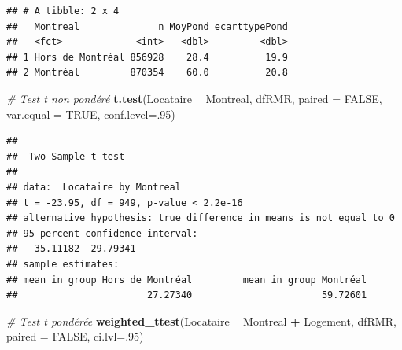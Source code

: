 \documentclass[
  11pt,
  french,
]{book}
\makeatletter
\newenvironment{Shaded}{\begin{snugshade}}{\end{snugshade}}
\newcommand{\CommentTok}[1]{\textcolor[rgb]{0.56,0.35,0.01}{\textit{#1}}}
\newcommand{\DataTypeTok}[1]{\textcolor[rgb]{0.13,0.29,0.53}{#1}}
\newcommand{\DecValTok}[1]{\textcolor[rgb]{0.00,0.00,0.81}{#1}}
\newcommand{\KeywordTok}[1]{\textcolor[rgb]{0.13,0.29,0.53}{\textbf{#1}}}
\newcommand{\NormalTok}[1]{#1}
\newcommand{\OperatorTok}[1]{\textcolor[rgb]{0.81,0.36,0.00}{\textbf{#1}}}
\newcommand{\OtherTok}[1]{\textcolor[rgb]{0.56,0.35,0.01}{#1}}
\newcommand{\StringTok}[1]{\textcolor[rgb]{0.31,0.60,0.02}{#1}}
\newenvironment{kframe}{%
\medskip{}
\setlength{\fboxsep}{.8em}
 \def\at@end@of@kframe{}%
 \ifinner\ifhmode%
  \def\at@end@of@kframe{\end{minipage}}%
  \begin{minipage}{\columnwidth}%
 \fi\fi%
 \def\FrameCommand##1{\hskip\@totalleftmargin \hskip-\fboxsep
 \colorbox{shadecolor}{##1}\hskip-\fboxsep
     \hskip-\linewidth \hskip-\@totalleftmargin \hskip\columnwidth}%
 \MakeFramed {\advance\hsize-\width
   \@totalleftmargin\z@ \linewidth\hsize
   \@setminipage}}%
 {\par\unskip\endMakeFramed%
 \at@end@of@kframe}
\renewenvironment{Shaded}{\begin{kframe}}{\end{kframe}}
\makeatother
\begin{document}
\begin{Shaded}
\end{Shaded}

\begin{verbatim}
## # A tibble: 2 x 4
##   Montreal              n MoyPond ecarttypePond
##   <fct>             <int>   <dbl>         <dbl>
## 1 Hors de Montréal 856928    28.4          19.9
## 2 Montréal         870354    60.0          20.8
\end{verbatim}

\begin{Shaded}
\begin{Highlighting}[]
\CommentTok{# Test t non pondéré}
\KeywordTok{t.test}\NormalTok{(Locataire }\OperatorTok{~}\StringTok{ }\NormalTok{Montreal, dfRMR, }
               \DataTypeTok{paired =} \OtherTok{FALSE}\NormalTok{, }\DataTypeTok{var.equal =} \OtherTok{TRUE}\NormalTok{, }\DataTypeTok{conf.level=}\NormalTok{.}\DecValTok{95}\NormalTok{)}
\end{Highlighting}
\end{Shaded}

\begin{verbatim}
## 
## 	Two Sample t-test
## 
## data:  Locataire by Montreal
## t = -23.95, df = 949, p-value < 2.2e-16
## alternative hypothesis: true difference in means is not equal to 0
## 95 percent confidence interval:
##  -35.11182 -29.79341
## sample estimates:
## mean in group Hors de Montréal         mean in group Montréal 
##                       27.27340                       59.72601
\end{verbatim}

\begin{Shaded}
\begin{Highlighting}[]
\CommentTok{# Test t pondérée}
\KeywordTok{weighted_ttest}\NormalTok{(Locataire }\OperatorTok{~}\StringTok{ }\NormalTok{Montreal }\OperatorTok{+}\StringTok{ }\NormalTok{Logement, dfRMR, }
               \DataTypeTok{paired =} \OtherTok{FALSE}\NormalTok{, }\DataTypeTok{ci.lvl=}\NormalTok{.}\DecValTok{95}\NormalTok{)}
\end{Highlighting}
\end{Shaded}
\end{document}
